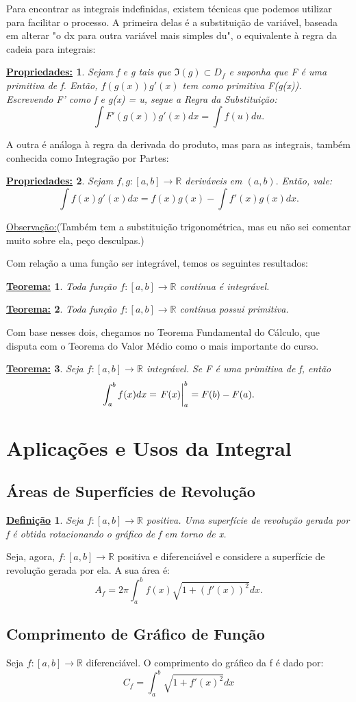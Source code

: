 \documentclass{article}
\newtheorem*{def*}{\underline{Defini\c c\~ao}}
\newtheorem*{prop*}{\underline{Propriedades:}}
\newtheorem*{thm*}{\underline{Teorema:}}
\begin{document}
    Para encontrar as integrais indefinidas, existem t\'ecnicas que podemos utilizar para facilitar o processo. A primeira delas \'e a substitui\c c\~ao de vari\'avel,
    baseada em alterar "o dx para outra vari\'avel mais simples du", o equivalente \`a regra da cadeia para integrais:
    \begin{prop*}
        Sejam f e g tais que $\Im(g)\subset{D_f}$ e suponha que F \'e uma primitiva de f. Ent\~ao, $f(g(x))g'(x)$ tem como primitiva F(g(x)). Escrevendo F' como f
        e g(x) = u, segue a Regra da Substitui\c c\~ao:
        $$
            \int F'(g(x))g'(x)dx = \int f(u) du.
        $$
    \end{prop*}
    A outra \'e an\'aloga \`a regra da derivada do produto, mas para as integrais, tamb\'em conhecida como Integra\c c\~ao por Partes:
    \begin{prop*}
        Sejam $f, g:[a, b]\rightarrow\mathbb{R}$ deriv\'aveis em $(a, b).$ Ent\~ao, vale:
        $$
            \int f(x)g'(x)dx = f(x)g(x) - \int f'(x)g(x)dx.
        $$
    \end{prop*}
    \underline{Observa\c c\~ao:}(Tamb\'em tem a substitui\c c\~ao trigonom\'etrica, mas eu n\~ao sei comentar muito sobre ela, pe\c co desculpas.)

    Com rela\c c\~ao a uma fun\c c\~ao ser integr\'avel, temos os seguintes resultados:
    \begin{thm*}
        Toda fun\c c\~ao $f:[a, b]\rightarrow\mathbb{R}$ cont\'inua \'e integr\'avel.
    \end{thm*}
    \begin{thm*}
        Toda fun\c c\~ao $f:[a, b]\rightarrow\mathbb{R}$ cont\'inua possui primitiva.
    \end{thm*}
    Com base nesses dois, chegamos no Teorema Fundamental do C\'alculo, que disputa com o Teorema do Valor M\'edio como o mais importante do curso.
    \begin{thm*}
        Seja $f:[a, b]\rightarrow\mathbb{R}$ integr\'avel. Se F \'e uma primitiva de f, ent\~ao
        $$
            \int_{a}^{b} f(x)dx = \eval{F(x)}_{a}^{b} = F(b) - F(a).
        $$
    \end{thm*}

    \section{Aplica\c c\~oes e Usos da Integral}
    \subsection{\'Areas de Superf\'icies de Revolu\c c\~ao}
    \begin{def*}
        Seja $f:[a, b]\rightarrow\mathbb{R}$ positiva. Uma superf\'icie de revolu\c c\~ao gerada por f \'e obtida rotacionando 
        o gr\'afico de f em torno de x.
    \end{def*}
    Seja, agora, $f:[a, b]\rightarrow\mathbb{R}$ positiva e diferenci\'avel e considere a superf\'icie de revolu\c c\~ao gerada por ela.
    A sua \'area \'e:
    $$
        A_f = 2\pi\int_{a}^{b} f(x)\sqrt{1+(f'(x))^2}dx.
    $$
    \subsection{Comprimento de Gr\'afico de Fun\c c\~ao}
    Seja $f:[a, b]\rightarrow\mathbb{R}$ diferenci\'avel. O comprimento do gr\'afico da f \'e dado por:
    $$
        C_f = \int_{a}^{b} \sqrt{1+f'(x)^2}dx 
    $$
\end{document}
